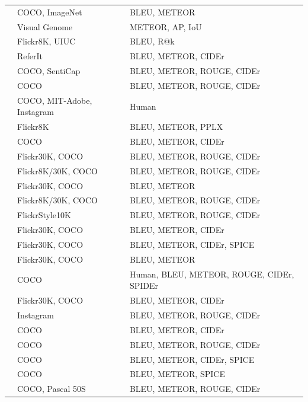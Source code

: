 \begin{longtable}{ p{} p{} p{} }
    \citet{Hendricks2016} & COCO, ImageNet & BLEU, METEOR \\
    \citet{Johnson2016} & Visual Genome & METEOR, AP, IoU \\
    \citet{Ma2016} & Flickr8K, UIUC & BLEU, R@k \\
    \citet{Mao2016} & ReferIt & BLEU, METEOR, CIDEr \\
    \citet{Mathews2016} & COCO, SentiCap & BLEU, METEOR, ROUGE, CIDEr \\
    \citet{Sugano2016} & COCO & BLEU, METEOR, ROUGE, CIDEr \\
    \citet{Tran2016} & COCO, MIT-Adobe, Instagram &  Human\\
    \citet{Wang2016_Parallel} & Flickr8K & BLEU, METEOR, PPLX \\
    \citet{Yang2016_RevNet} & COCO & BLEU, METEOR, CIDEr \\
    \citet{You2016} & Flickr30K, COCO & BLEU, METEOR, ROUGE, CIDEr \\
    \citet{Chen2017} & Flickr8K/30K, COCO & BLEU, METEOR, ROUGE, CIDEr \\
    \citet{Dai2017} & Flickr30K, COCO & BLEU, METEOR \\
    \citet{Fu2017} & Flickr8K/30K, COCO & BLEU, METEOR, ROUGE, CIDEr \\
    \citet{Gan2017a} & FlickrStyle10K & BLEU, METEOR, ROUGE, CIDEr \\
    \citet{Gan2017b} & Flickr30K, COCO &  BLEU, METEOR, CIDEr \\
    \citet{Gu2017} & Flickr30K, COCO & BLEU, METEOR, CIDEr, SPICE \\
    \citet{Liu2017_SAM} & Flickr30K, COCO & BLEU, METEOR \\
    \citet{Liu2017_PG} & COCO & Human, BLEU, METEOR, ROUGE, CIDEr, SPIDEr \\
    \citet{Lu2017} & Flickr30K, COCO & BLEU, METEOR, CIDEr \\
    \citet{Park2017} & Instagram & BLEU, METEOR, ROUGE, CIDEr \\
    \citet{Pedersoli2017} & COCO & BLEU, METEOR, CIDEr \\
    \citet{Ren2017} & COCO & BLEU, METEOR, ROUGE, CIDEr \\
    \citet{Rennie2017} & COCO & BLEU, METEOR, CIDEr, SPICE \\
    \citet{Shetty2017} & COCO & BLEU, METEOR, SPICE \\
    \citet{Tavakoliy2017} & COCO, Pascal 50S & BLEU, METEOR, ROUGE, CIDEr \\

\end{longtable}
